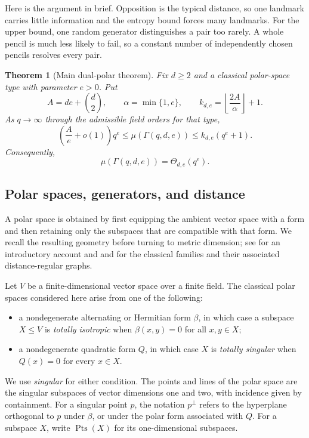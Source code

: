 \documentclass[11pt]{article}
\newtheorem{theorem}{Theorem}[section]
\theoremstyle{definition}
\theoremstyle{remark}
\newcommand{\Pts}{\operatorname{Pts}}
\begin{document}
Here is the argument in brief.  Opposition is the typical distance, so one
landmark carries little information and the entropy bound forces many
landmarks.  For the upper bound, one random generator distinguishes a pair
too rarely.  A whole pencil is much less likely to fail, so a constant
number of independently chosen pencils resolves every pair.

\begin{theorem}[Main dual-polar theorem]\label{thm:dual-main}
Fix $d\geq2$ and a classical polar-space type with parameter $e>0$.  Put
\[
        A=de+\binom d2,\qquad
        \alpha=\min\{1,e\},\qquad
        k_{d,e}=\left\lfloor\frac{2A}{\alpha}\right\rfloor+1.
\]
As $q\to\infty$ through the admissible field orders for that type,
\[
        \left(\frac{A}{e}+o(1)\right)q^e
        \leq
        \mu(\Gamma(q,d,e))
        \leq
        k_{d,e}(q^e+1).
\]
Consequently,
\[
        \mu(\Gamma(q,d,e))=\Theta_{d,e}(q^e).
\]
\end{theorem}

\subsection{Polar spaces, generators, and distance}

A polar space is obtained by first equipping the ambient vector space with 
a
form and then retaining only the subspaces that are compatible with that
form.  We recall the resulting geometry before turning to metric 
dimension;
see \cite[Sec.~4]{BishnoiFiniteGeometry} for an introductory account and
\cite[Ch.~9]{BCN} and \cite[Sec.~3.1]{VanDamKoolenTanaka} for the 
classical
families and their associated distance-regular graphs.

Let $V$ be a finite-dimensional vector space over a finite field.  The
classical polar spaces considered here arise from one of the following:
\begin{itemize}[leftmargin=2em]
\item a nondegenerate alternating or Hermitian form $\beta$, in which case 
a
      subspace $X\leq V$ is \emph{totally isotropic} when
      $\beta(x,y)=0$ for all $x,y\in X$;
\item a nondegenerate quadratic form $Q$, in which case $X$ is
      \emph{totally singular} when $Q(x)=0$ for every $x\in X$.
\end{itemize}
We use \emph{singular} for either condition.  The points and lines of the
polar space are the singular subspaces of vector dimensions one and two,
with incidence given by containment.  For a singular point $p$, the 
notation
$p^\perp$ refers to the hyperplane orthogonal to $p$ under $\beta$, or 
under
the polar form associated with $Q$.
For a subspace $X$, write $\Pts(X)$ for its one-dimensional subspaces.
\end{document}
